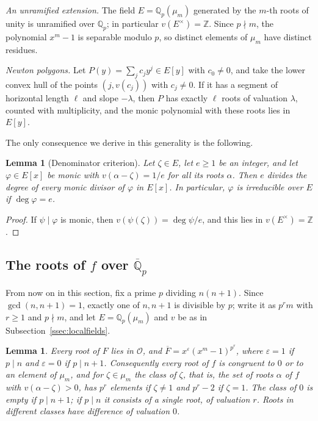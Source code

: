 \documentclass[11pt]{amsart}
\newtheorem{lemma}[theorem]{Lemma}
\theoremstyle{definition}
\theoremstyle{remark}
\numberwithin{equation}{section}
\newcommand{\Q}{\mathbb{Q}}
\newcommand{\Z}{\mathbb{Z}}
\newcommand{\Qp}{\mathbb{Q}_p}
\newcommand{\cO}{\mathcal{O}}
\begin{document}
\emph{An unramified extension.} The field $E=\Qp(\mu_m)$ generated by the
$m$-th roots of unity is unramified over $\Qp$; in particular
$v(E^\times)=\Z$. Since $p\nmid m$, the polynomial $x^m-1$ is separable
modulo $p$, so distinct elements of $\mu_m$ have distinct residues.

\emph{Newton polygons.} Let $P(y)=\sum_jc_jy^j\in E[y]$ with $c_0\ne0$, and
take the lower convex hull of the points $(j,v(c_j))$ with $c_j\ne0$. If it
has a segment of horizontal length $\ell$ and slope $-\lambda$, then $P$ has
exactly $\ell$ roots of valuation $\lambda$, counted with multiplicity, and
the monic polynomial with these roots lies in $E[y]$.

The only consequence we derive in this generality is the following.

\begin{lemma}[Denominator criterion]\label{lem:denom}
Let $\zeta\in E$, let $e\ge1$ be an integer, and let $\varphi\in E[x]$ be
monic with $v(\alpha-\zeta)=1/e$ for all its roots $\alpha$. Then $e$
divides the degree of every monic divisor of $\varphi$ in $E[x]$. In
particular, $\varphi$ is irreducible over $E$ if $\deg\varphi=e$.
\end{lemma}

\begin{proof}
If $\psi\mid\varphi$ is monic, then $v(\psi(\zeta))=\deg\psi/e$, and this
lies in $v(E^\times)=\Z$.
\end{proof}

\subsection{The roots of \texorpdfstring{$f$}{f} over \texorpdfstring{$\overline{\Q}_p$}{the p-adic numbers}}\label{ssec:proots}
From now on in this section, fix a prime $p$ dividing $n(n+1)$. Since
$\gcd(n,n+1)=1$, exactly one of $n,n+1$ is divisible by $p$; write it as
$p^rm$ with $r\ge1$ and $p\nmid m$, and let $E=\Qp(\mu_m)$ and $v$ be as in
Subsection~\ref{ssec:localfields}.

\begin{lemma}\label{lem:classes}
Every root of $F$ lies in $\cO$, and
$\overline F=x^{\varepsilon}(x^m-1)^{p^r}$, where $\varepsilon=1$ if
$p\mid n$ and $\varepsilon=0$ if $p\mid n+1$. Consequently every root of
$f$ is congruent to $0$ or to an element of $\mu_m$, and for
$\zeta\in\mu_m$ the \emph{class} of $\zeta$, that is, the set of roots
$\alpha$ of $f$ with $v(\alpha-\zeta)>0$, has $p^r$ elements if
$\zeta\ne1$ and $p^r-2$ if $\zeta=1$. The class of $0$ is empty if
$p\mid n+1$; if $p\mid n$ it consists of a single root, of valuation $r$.
Roots in different classes have difference of valuation $0$.
\end{lemma}
\end{document}
